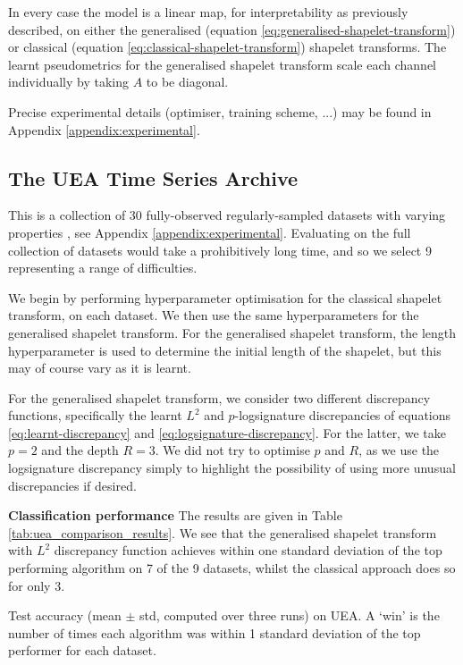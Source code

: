 \documentclass{article}
\theoremstyle{plain}
\theoremstyle{definition}
\newcommand{\boldheading}[1]{

\textbf{#1}\quad}
\begin{document}
In every case the model is a linear map, for interpretability as previously described, on either the generalised (equation \eqref{eq:generalised-shapelet-transform}) or classical (equation \eqref{eq:classical-shapelet-transform}) shapelet transforms. The learnt pseudometrics for the generalised shapelet transform scale each channel individually by taking $A$ to be diagonal.

Precise experimental details (optimiser, training scheme, ...) may be found in Appendix \ref{appendix:experimental}.

\subsection{The UEA Time Series Archive} \label{subsec:uea_classification}
This is a collection of 30 fully-observed regularly-sampled datasets with varying properties \cite{bagnall2018uea}, see Appendix \ref{appendix:experimental}. Evaluating on the full collection of datasets would take a prohibitively long time, and so we select 9 representing a range of difficulties.

We begin by performing hyperparameter optimisation %
for the classical shapelet transform, on each dataset. We then use the same hyperparameters for the generalised shapelet transform. For the generalised shapelet transform, the length hyperparameter is used to determine the initial length of the shapelet, but this may of course vary as it is learnt.

For the generalised shapelet transform, we consider two different discrepancy functions, specifically the learnt $L^2$ and $p$-logsignature discrepancies of equations \eqref{eq:learnt-discrepancy} and \eqref{eq:logsignature-discrepancy}. For the latter, we take $p=2$ and the depth $R=3$. We did not try to optimise $p$ and $R$, as we use the logsignature discrepancy simply to highlight the possibility of using more unusual discrepancies if desired.

\boldheading{Classification performance} The results are given in Table \ref{tab:uea_comparison_results}. We see that the generalised shapelet transform with $L^2$ discrepancy function achieves within one standard deviation of the top performing algorithm on 7 of the 9 datasets, whilst the classical approach does so for only 3.%
\begin{table}[t]
    \centering
    \caption{Test accuracy (mean $\pm$ std, computed over three runs) on UEA. A `win' is the number of times each algorithm was within 1 standard deviation of the top performer for each dataset.}
    \label{tab:uea_comparison_results}
    
\end{table}
\end{document}
